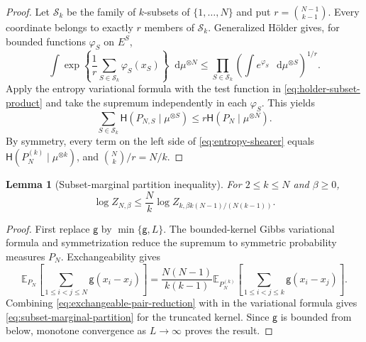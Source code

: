 \documentclass[11pt,reqno]{amsart}
\numberwithin{equation}{section}
\theoremstyle{plain}
\newtheorem{lemma}[lemma]{Lemma}
\theoremstyle{definition}
\newcommand{\dd}{\mathop{}\!\mathrm d}
\newcommand{\E}{\mathbb E}
\newcommand{\be}{\beta}
\newcommand{\g}{\mathsf g}
\newcommand{\Hr}{\mathsf H}
\begin{document}
\begin{proof}
Let $\mathcal S_k$ be the family of $k$-subsets of $\{1,\ldots,N\}$ and put $r=\binom{N-1}{k-1}$.  Every coordinate belongs to exactly $r$ members of $\mathcal S_k$.  Generalized H\"older gives, for bounded functions $\varphi_S$ on $E^S$,
\begin{equation}
 \int\exp\left\{\frac1r\sum_{S\in\mathcal S_k}\varphi_S(x_S)\right\}
 \dd\mu^{\otimes N}
 \leq\prod_{S\in\mathcal S_k}
 \left(\int e^{\varphi_S}\,\dd\mu^{\otimes S}\right)^{1/r}.
 \label{eq:holder-subset-product}
\end{equation}
Apply the entropy variational formula with the test function in \eqref{eq:holder-subset-product} and take the supremum independently in each $\varphi_S$.  This yields
\begin{equation}
 \sum_{S\in\mathcal S_k}\Hr(P_{N,S}\mid\mu^{\otimes S})
 \leq r\Hr(P_N\mid\mu^{\otimes N}).
 \label{eq:entropy-shearer}
\end{equation}
By symmetry, every term on the left side of \eqref{eq:entropy-shearer} equals $\Hr(P_N^{(k)}\mid\mu^{\otimes k})$, and $\binom Nk/r=N/k$.
\end{proof}

\begin{lemma}[Subset-marginal partition inequality]
\label{lem:subset-marginal-partition}
For $2\leq k\leq N$ and $\be\geq0$,
\begin{equation}
 \log Z_{N,\be}
 \leq\frac Nk\log Z_{k,\be k(N-1)/(N(k-1))}.
 \label{eq:subset-marginal-partition}
\end{equation}
\end{lemma}

\begin{proof}
First replace $\g$ by $\min\{\g,L\}$.  The bounded-kernel Gibbs variational formula and symmetrization reduce the supremum to symmetric probability measures $P_N$.  Exchangeability gives
\begin{equation}
 \E_{P_N}\left[\sum_{1\leq i<j\leq N}\g(x_i-x_j)\right]
 =\frac{N(N-1)}{k(k-1)}
 \E_{P_N^{(k)}}\left[\sum_{1\leq i<j\leq k}\g(x_i-x_j)\right].
 \label{eq:exchangeable-pair-reduction}
\end{equation}
Combining \eqref{eq:exchangeable-pair-reduction} with  in the variational formula gives \eqref{eq:subset-marginal-partition} for the truncated kernel.  Since $\g$ is bounded from below, monotone convergence as $L\to\infty$ proves the result.
\end{proof}
\end{document}
